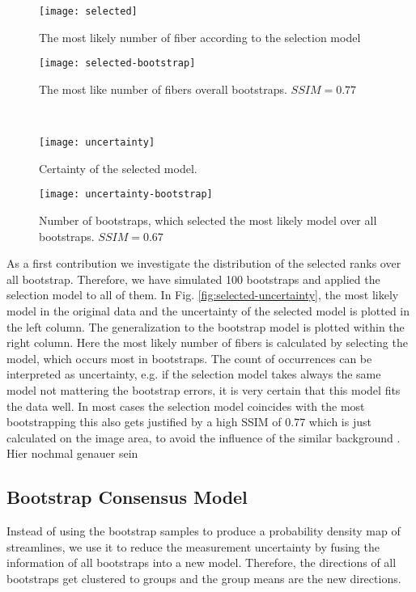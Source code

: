 \begin{figure*}[h]
	\centering
	\begin{subfigure}[b]{0.33\linewidth}
		\texttt{[image: selected]}
		\caption{The most likely number of fiber according to the
		selection model}
	\end{subfigure}
	\begin{subfigure}[b]{0.33\linewidth}
		\texttt{[image: selected-bootstrap]}
		\caption{The most like number of fibers overall bootstraps.
		$SSIM=0.77$}
\end{subfigure}  \\

	\begin{subfigure}[b]{0.33\linewidth}
		\texttt{[image: uncertainty]}
		\caption{Certainty of the selected model.}
	\end{subfigure}
	\begin{subfigure}[b]{0.33\linewidth}
		\texttt{[image: uncertainty-bootstrap]}
		\caption{Number of bootstraps, which selected the most likely
		model over all bootstraps. $SSIM=0.67$}
	\end{subfigure}
	\caption{Comparison of model selection with and without bootstrapping.}
	\label{fig:selected-uncertainty}
\end{figure*}
As a first contribution we investigate the distribution of the selected ranks
over all bootstrap. Therefore, we have simulated 100 bootstraps and applied the
selection model to all of them. In Fig. \ref{fig:selected-uncertainty}, the most
likely model in the original data and the uncertainty of the selected model is
plotted in the left column. The generalization to the bootstrap model is
plotted within the right column. Here the most likely number of fibers is
calculated by selecting the model, which occurs most in bootstraps. The count of
occurrences can be interpreted as uncertainty, e.g. if the selection model takes
always the same model not mattering the bootstrap errors, it is very certain
that this model fits the data well.  
In most cases the selection model coincides with the most bootstrapping this
also gets justified by a high SSIM of $0.77$ which is just calculated on the
image area, to avoid the influence of the similar background
\cite{wang2004image}. 
Hier nochmal genauer sein



\subsection{Bootstrap Consensus Model}
Instead of using the bootstrap samples to produce a probability density map of
streamlines, we use it to reduce the measurement uncertainty by fusing the
information of all bootstraps into a new model. 
Therefore, the directions of all bootstraps get clustered to groups and the
group means are the new directions.


